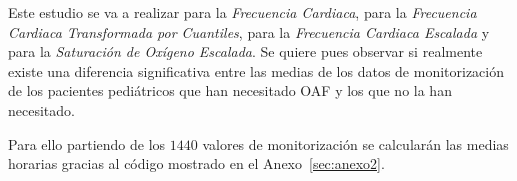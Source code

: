 Este estudio se va a realizar para la \textit{Frecuencia Cardiaca}, para la \textit{Frecuencia Cardiaca Transformada por Cuantiles}, para la \textit{Frecuencia Cardiaca Escalada} y para la \textit{Saturación de Oxígeno Escalada}. Se quiere pues observar si realmente existe una diferencia significativa entre las medias de los datos de monitorización de los pacientes pediátricos que han necesitado OAF y los que no la han necesitado.

Para ello partiendo de los $1440$ valores de monitorización se calcularán las medias horarias gracias al código mostrado en el Anexo~\ref{sec:anexo2}.



